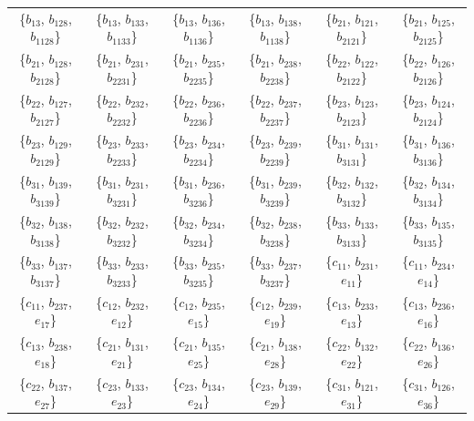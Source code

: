 \documentclass[%
  reprint,
  superscriptaddress,
  showkeys,
  amsmath,amssymb,
  aps,pra,
  longbibliography,
  floatfix,
  x11names
]{revtex4-2}
\begin{document}
\begin{table}[htbp!]
\begin{ruledtabular}
\begin{tabular}{*{6}{c}}
\{$b_{13}$, $b_{128}$, $b_{1128}$\} & \{$b_{13}$, $b_{133}$, $b_{1133}$\} & \{$b_{13}$, $b_{136}$, $b_{1136}$\} & \{$b_{13}$, $b_{138}$, $b_{1138}$\} & \{$b_{21}$, $b_{121}$, $b_{2121}$\} & \{$b_{21}$, $b_{125}$, $b_{2125}$\} \\
\{$b_{21}$, $b_{128}$, $b_{2128}$\} & \{$b_{21}$, $b_{231}$, $b_{2231}$\} & \{$b_{21}$, $b_{235}$, $b_{2235}$\} & \{$b_{21}$, $b_{238}$, $b_{2238}$\} & \{$b_{22}$, $b_{122}$, $b_{2122}$\} & \{$b_{22}$, $b_{126}$, $b_{2126}$\} \\
\{$b_{22}$, $b_{127}$, $b_{2127}$\} & \{$b_{22}$, $b_{232}$, $b_{2232}$\} & \{$b_{22}$, $b_{236}$, $b_{2236}$\} & \{$b_{22}$, $b_{237}$, $b_{2237}$\} & \{$b_{23}$, $b_{123}$, $b_{2123}$\} & \{$b_{23}$, $b_{124}$, $b_{2124}$\} \\
\{$b_{23}$, $b_{129}$, $b_{2129}$\} & \{$b_{23}$, $b_{233}$, $b_{2233}$\} & \{$b_{23}$, $b_{234}$, $b_{2234}$\} & \{$b_{23}$, $b_{239}$, $b_{2239}$\} & \{$b_{31}$, $b_{131}$, $b_{3131}$\} & \{$b_{31}$, $b_{136}$, $b_{3136}$\} \\
\{$b_{31}$, $b_{139}$, $b_{3139}$\} & \{$b_{31}$, $b_{231}$, $b_{3231}$\} & \{$b_{31}$, $b_{236}$, $b_{3236}$\} & \{$b_{31}$, $b_{239}$, $b_{3239}$\} & \{$b_{32}$, $b_{132}$, $b_{3132}$\} & \{$b_{32}$, $b_{134}$, $b_{3134}$\} \\
\{$b_{32}$, $b_{138}$, $b_{3138}$\} & \{$b_{32}$, $b_{232}$, $b_{3232}$\} & \{$b_{32}$, $b_{234}$, $b_{3234}$\} & \{$b_{32}$, $b_{238}$, $b_{3238}$\} & \{$b_{33}$, $b_{133}$, $b_{3133}$\} & \{$b_{33}$, $b_{135}$, $b_{3135}$\} \\
\{$b_{33}$, $b_{137}$, $b_{3137}$\} & \{$b_{33}$, $b_{233}$, $b_{3233}$\} & \{$b_{33}$, $b_{235}$, $b_{3235}$\} & \{$b_{33}$, $b_{237}$, $b_{3237}$\} & \{$c_{11}$, $b_{231}$, $e_{11}$\} & \{$c_{11}$, $b_{234}$, $e_{14}$\} \\
\{$c_{11}$, $b_{237}$, $e_{17}$\} & \{$c_{12}$, $b_{232}$, $e_{12}$\} & \{$c_{12}$, $b_{235}$, $e_{15}$\} & \{$c_{12}$, $b_{239}$, $e_{19}$\} & \{$c_{13}$, $b_{233}$, $e_{13}$\} & \{$c_{13}$, $b_{236}$, $e_{16}$\} \\
\{$c_{13}$, $b_{238}$, $e_{18}$\} & \{$c_{21}$, $b_{131}$, $e_{21}$\} & \{$c_{21}$, $b_{135}$, $e_{25}$\} & \{$c_{21}$, $b_{138}$, $e_{28}$\} & \{$c_{22}$, $b_{132}$, $e_{22}$\} & \{$c_{22}$, $b_{136}$, $e_{26}$\} \\
\{$c_{22}$, $b_{137}$, $e_{27}$\} & \{$c_{23}$, $b_{133}$, $e_{23}$\} & \{$c_{23}$, $b_{134}$, $e_{24}$\} & \{$c_{23}$, $b_{139}$, $e_{29}$\} & \{$c_{31}$, $b_{121}$, $e_{31}$\} & \{$c_{31}$, $b_{126}$, $e_{36}$\} \\

\end{tabular}
\end{ruledtabular}
\end{table}
\end{document}
